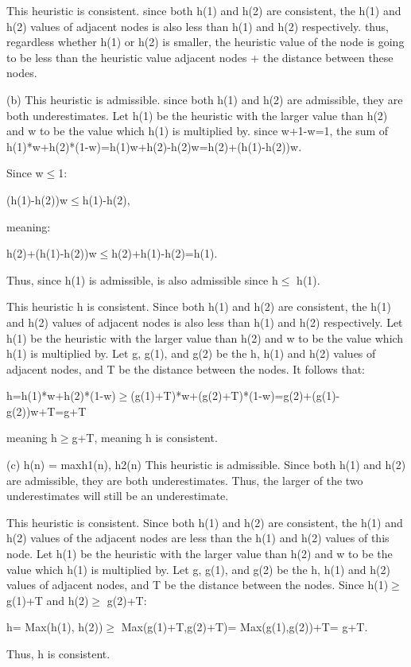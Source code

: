 \documentclass{article}
\begin{document}
\begin{enumerate}
This heuristic is consistent. since both h(1) and h(2) are consistent, the h(1) and h(2) values of adjacent nodes is also less than h(1) and h(2) respectively. thus, regardless whether h(1) or h(2) is smaller, the heuristic value of the node is going to be less than the heuristic value adjacent nodes + the distance between these nodes. 

(b) This heuristic is admissible. since both h(1) and h(2) are admissible, they are both underestimates. Let h(1) be the heuristic with the larger value than h(2) and w to be the value which h(1) is multiplied by. since w+1-w=1, the sum of h(1)*w+h(2)*(1-w)=h(1)w+h(2)-h(2)w=h(2)+(h(1)-h(2))w. 

Since w$\le$1:

(h(1)-h(2))w$\le$h(1)-h(2), 

meaning:

h(2)+(h(1)-h(2))w$\le$h(2)+h(1)-h(2)=h(1). 

Thus, since h(1) is admissible, is also admissible since h$\le$ h(1). 

This heuristic h is consistent. Since both h(1) and h(2) are consistent, the h(1) and h(2) values of adjacent nodes is also less than h(1) and h(2) respectively. Let h(1) be the heuristic with the larger value than h(2) and w to be the value which h(1) is multiplied by. Let g, g(1), and g(2) be the h, h(1) and h(2) values of adjacent nodes, and T be the distance between the nodes. It follows that:

h=h(1)*w+h(2)*(1-w)$\ge$(g(1)+T)*w+(g(2)+T)*(1-w)=g(2)+(g(1)-g(2))w+T=g+T

meaning h$\ge$g+T, meaning h is consistent. 

(c)
h(n) = max{h1(n), h2(n)}
This heuristic is admissible. Since both h(1) and h(2) are admissible, they are both underestimates. Thus, the larger of the two underestimates will still be an underestimate. 

This heuristic is consistent. Since both h(1) and h(2) are consistent, the h(1) and h(2) values of the adjacent nodes are less than the h(1) and h(2) values of this node.  Let h(1) be the heuristic with the larger value than h(2) and w to be the value which h(1) is multiplied by. Let g, g(1), and g(2) be the h, h(1) and h(2) values of adjacent nodes, and T be the distance between the nodes. Since h(1)$\ge$ g(1)+T and h(2)$\ge$ g(2)+T:

h= Max(h(1), h(2))$\ge$ Max(g(1)+T,g(2)+T)= Max(g(1),g(2))+T= g+T. 

Thus, h is consistent. 


\end{enumerate}
\end{document}
